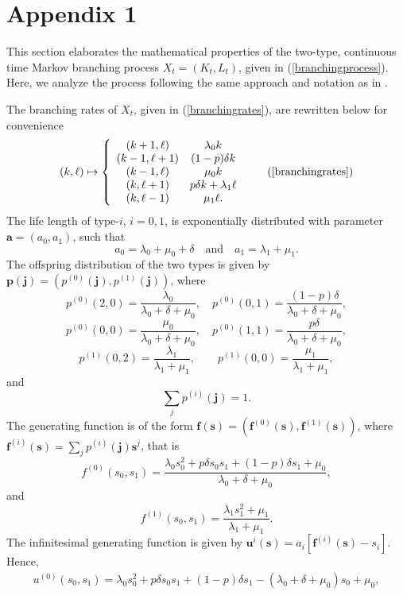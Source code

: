 \documentclass[a4paper,11pt]{article}
\theoremstyle{plain}
\theoremstyle{definition}
\numberwithin{equation}{section}
\begin{document}
\section*{Appendix 1}


This section elaborates the mathematical properties of 
the two-type, continuous time Markov branching process 
$X_t=(K_t,L_t)$, given in (\ref{branchingprocess}). 
Here, we analyze the process following the same approach 
and notation as in \cite{athreya_ney}.


The branching rates of $X_t$, given in (\ref{branchingrates}), are rewritten below for convenience 
\begin{equation}
(k,\ell)\mapsto \left\{
\begin{array}{cc}
(k+1,\ell) & \lambda_0 k\\
(k-1,\ell+1) & (1-p)\delta k\\
(k-1,\ell) & \mu_0 k\\
(k,\ell+1) & p\delta k+\lambda_1 \ell\\
(k,\ell-1) & \mu_1 \ell.
\end{array}
\right. \tag{\ref{branchingrates}}
\end{equation}
The life length of type-$i$, $i=0,1$, is exponentially distributed 
with parameter $\mathbf{a}=(a_0,a_1)$, such that
\[
a_0=\lambda_0+\mu_0+\delta\quad \mbox{and} \quad a_1=\lambda_1+\mu_1.
\]
The offspring distribution of the two types is given by 
$\mathbf{p(j)}=(p^{(0)}(\mathbf{j}),p^{(1)}(\mathbf{j}))$, where
\[
p^{(0)}(2,0)=\frac{\lambda_0}{\lambda_0+\delta+\mu_0},\quad
p^{(0)}(0,1)=\frac{(1-p)\delta}{\lambda_0+\delta+\mu_0},
\]
\[
p^{(0)}(0,0)=\frac{\mu_0}{\lambda_0+\delta+\mu_0},\quad
p^{(0)}(1,1)=\frac{p\delta}{\lambda_0+\delta+\mu_0},
\]
\[
p^{(1)}(0,2)= \frac{\lambda_1}{\lambda_1+\mu_1},\quad \quad
p^{(1)}(0,0)=\frac{\mu_1}{\lambda_1+\mu_1},
\]
and  $$\sum_{j} p^{(i)}(\mathbf{j})=1.$$
The generating function is of the form 
$\mathbf{f(s)}=(\mathbf{f}^{(0)}(\mathbf{s}),\mathbf{f}^{(1)}(\mathbf{s}))$,
where $\mathbf{f}^{(i)}(\mathbf{s})=\sum_{j} p^{(i)}(\mathbf{j})\mathbf{s}^j$, 
that is
\[
f^{(0)}(s_0,s_1)=\frac{\lambda_0s_0^2+p\delta s_0s_1+(1-p)\delta s_1+\mu_0}{\lambda_0+\delta+\mu_0},
\]
and
\[
f^{(1)}(s_0,s_1)= \frac{\lambda_1s_1^2+\mu_1}{\lambda_1+\mu_1}.
\]
The infinitesimal generating function is given by 
$\mathbf{u}^{i}(\mathbf{s})=a_i[\mathbf{f}^{(i)}(\mathbf{s})-s_i]$. Hence,
\begin{equation}
\begin{aligned}\nonumber
u^{(0)}(s_0,s_1) ={} \lambda_0s_0^2+p\delta s_0s_1+ 
       (1-p)\delta s_1 -(\lambda_0+\delta+\mu_0)s_0+\mu_0,
\end{aligned}
\end{equation}
\end{document}

